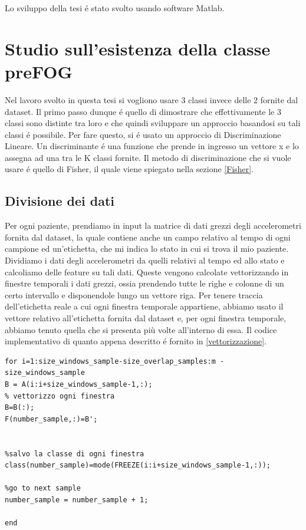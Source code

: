Lo sviluppo della tesi é stato svolto usando software Matlab.

\section{Studio sull'esistenza della classe preFOG}
Nel lavoro svolto in questa tesi si vogliono usare 3 classi invece delle 2 fornite dal dataset. Il primo passo dunque é quello di dimostrare che effettivamente le 3 classi sono distinte tra loro e che quindi sviluppare un approccio basandosi su tali classi é possibile. Per fare questo, si é usato un approccio di Discriminazione Lineare. Un discriminante é una funzione che prende in ingresso un vettore x e lo assegna ad una tra le K classi fornite. Il metodo di discriminazione che si vuole usare é quello di Fisher, il quale viene spiegato nella sezione \ref{Fisher}.\\
\subsection{Divisione dei dati}
Per ogni paziente, prendiamo in input la matrice di dati grezzi degli accelerometri fornita dal dataset, la quale contiene anche un campo relativo al tempo di ogni campione ed un'etichetta, che mi indica lo stato in cui si trova il mio paziente. Dividiamo i dati degli accelerometri da quelli relativi al tempo ed allo stato e calcoliamo delle feature su tali dati. Queste vengono calcolate vettorizzando in  finestre temporali i dati grezzi, ossia prendendo tutte le righe e colonne di un certo intervallo e disponendole lungo un vettore riga. Per tenere traccia dell'etichetta reale a cui ogni finestra temporale appartiene, abbiamo usato il vettore relativo all'etichetta fornita dal dataset e, per ogni finestra temporale, abbiamo tenuto quella che si presenta più volte all'interno di essa. Il codice implementativo di quanto appena descritto é fornito in \ref{vettorizzazione}.
\begin{lstlisting}[style=Matlab-editor,frame=single, caption=Vettorizzazione dei dati degli accelerometri, label=vettorizzazione]
for i=1:size_windows_sample-size_overlap_samples:m - size_windows_sample
B = A(i:i+size_windows_sample-1,:);
% vettorizzo ogni finestra
B=B(:);
F(number_sample,:)=B';


%salvo la classe di ogni finestra
class(number_sample)=mode(FREEZE(i:i+size_windows_sample-1,:));

%go to next sample
number_sample = number_sample + 1;

end
\end{lstlisting}
